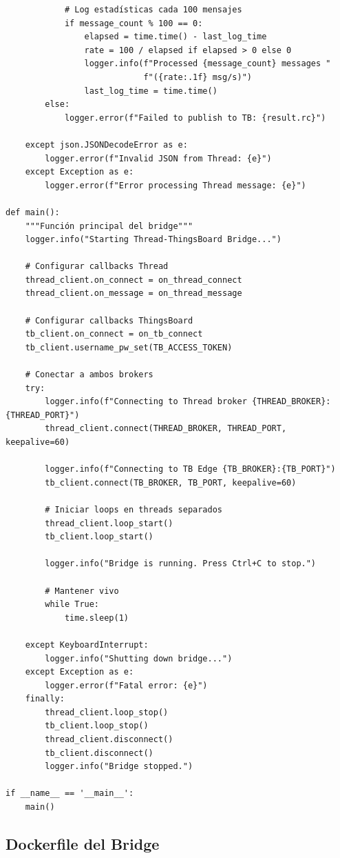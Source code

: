\begin{verbatim}
            # Log estadísticas cada 100 mensajes
            if message_count % 100 == 0:
                elapsed = time.time() - last_log_time
                rate = 100 / elapsed if elapsed > 0 else 0
                logger.info(f"Processed {message_count} messages "
                            f"({rate:.1f} msg/s)")
                last_log_time = time.time()
        else:
            logger.error(f"Failed to publish to TB: {result.rc}")
    
    except json.JSONDecodeError as e:
        logger.error(f"Invalid JSON from Thread: {e}")
    except Exception as e:
        logger.error(f"Error processing Thread message: {e}")

def main():
    """Función principal del bridge"""
    logger.info("Starting Thread-ThingsBoard Bridge...")
    
    # Configurar callbacks Thread
    thread_client.on_connect = on_thread_connect
    thread_client.on_message = on_thread_message
    
    # Configurar callbacks ThingsBoard
    tb_client.on_connect = on_tb_connect
    tb_client.username_pw_set(TB_ACCESS_TOKEN)
    
    # Conectar a ambos brokers
    try:
        logger.info(f"Connecting to Thread broker {THREAD_BROKER}:{THREAD_PORT}")
        thread_client.connect(THREAD_BROKER, THREAD_PORT, keepalive=60)
        
        logger.info(f"Connecting to TB Edge {TB_BROKER}:{TB_PORT}")
        tb_client.connect(TB_BROKER, TB_PORT, keepalive=60)
        
        # Iniciar loops en threads separados
        thread_client.loop_start()
        tb_client.loop_start()
        
        logger.info("Bridge is running. Press Ctrl+C to stop.")
        
        # Mantener vivo
        while True:
            time.sleep(1)
    
    except KeyboardInterrupt:
        logger.info("Shutting down bridge...")
    except Exception as e:
        logger.error(f"Fatal error: {e}")
    finally:
        thread_client.loop_stop()
        tb_client.loop_stop()
        thread_client.disconnect()
        tb_client.disconnect()
        logger.info("Bridge stopped.")

if __name__ == '__main__':
    main()
\end{verbatim}

\subsection{Dockerfile del Bridge}


